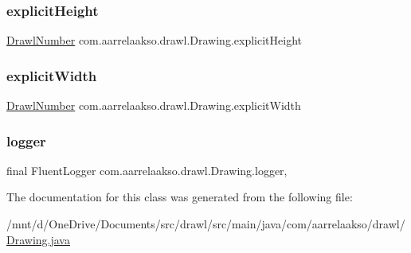 \subsubsection{\texorpdfstring{explicit\+Height}{explicitHeight}}
{\footnotesize\ttfamily \hyperlink{classcom_1_1aarrelaakso_1_1drawl_1_1_drawl_number}{Drawl\+Number} com.\+aarrelaakso.\+drawl.\+Drawing.\+explicit\+Height\hspace{0.3cm}{\ttfamily [private]}}

\mbox{\label{classcom_1_1aarrelaakso_1_1drawl_1_1_drawing_ab6cf5047fe1a446a083c53a059332c27}} 
\subsubsection{\texorpdfstring{explicit\+Width}{explicitWidth}}
{\footnotesize\ttfamily \hyperlink{classcom_1_1aarrelaakso_1_1drawl_1_1_drawl_number}{Drawl\+Number} com.\+aarrelaakso.\+drawl.\+Drawing.\+explicit\+Width\hspace{0.3cm}{\ttfamily [private]}}

\mbox{\label{classcom_1_1aarrelaakso_1_1drawl_1_1_drawing_a9ca07608ceeb04d747e114cd1a82a3f9}} 
\subsubsection{\texorpdfstring{logger}{logger}}
{\footnotesize\ttfamily final Fluent\+Logger com.\+aarrelaakso.\+drawl.\+Drawing.\+logger\hspace{0.3cm}{\ttfamily [static]}, {\ttfamily [private]}}



The documentation for this class was generated from the following file\+:\begin{DoxyCompactItemize}
\item 
/mnt/d/\+One\+Drive/\+Documents/src/drawl/src/main/java/com/aarrelaakso/drawl/\hyperlink{_drawing_8java}{Drawing.\+java}\end{DoxyCompactItemize}
